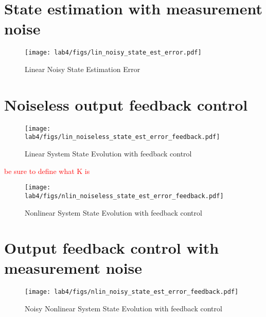 \documentclass[10pt]{article}
\newcommand{\figscalingfactor}{0.85}
\begin{document}
\section{State estimation with measurement noise}

\begin{figure}
    \centering
    \texttt{[image: lab4/figs/lin\_noisy\_state\_est\_error.pdf]}
    \caption{Linear Noisy State Estimation Error}
    \label{fig:lin_noisy_state_est_error}
\end{figure}

\section{Noiseless output feedback control} 

\begin{figure}
    \centering
    \texttt{[image: lab4/figs/lin\_noiseless\_state\_est\_error\_feedback.pdf]}
    \caption{Linear System State Evolution with feedback control}
    \label{fig:lin_noiseless_state_est_error_feedback}
\end{figure}

\textcolor{red}{be sure to define what K is}




\begin{figure}
    \centering
    \texttt{[image: lab4/figs/nlin\_noiseless\_state\_est\_error\_feedback.pdf]}
    \caption{Nonlinear System State Evolution with feedback control}
    \label{fig:nlin_noiseless_state_est_error_feedback}
\end{figure}


\section{Output feedback control with measurement noise}

\begin{figure}
    \centering
    \texttt{[image: lab4/figs/nlin\_noisy\_state\_est\_error\_feedback.pdf]}
    \caption{Noisy Nonlinear System State Evolution with feedback control}
    \label{fig:nlin_noisy_state_est_error_feedback}
\end{figure}
\end{document}

